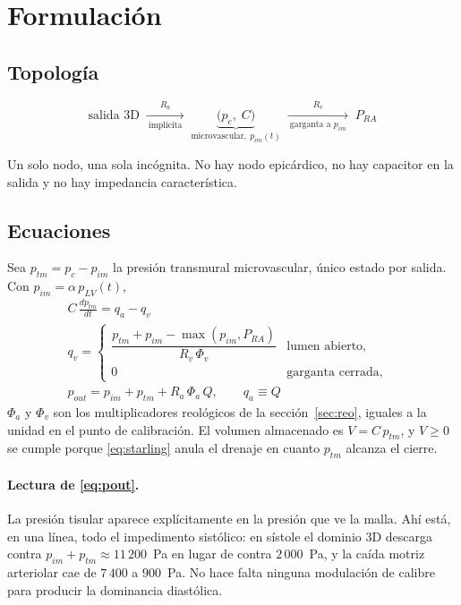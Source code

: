 \documentclass[11pt]{article}
\begin{document}
\section{Formulaci\'on}

\subsection{Topolog\'ia}

\[
\text{salida 3D}\;
\xrightarrow[\ \text{impl\'icita}\ ]{R_a}\;
\underbrace{\bigl(p_c,\;C\bigr)}_{\text{microvascular},\ p_{im}(t)}\;
\xrightarrow[\ \text{garganta a }p_{im}\ ]{R_v}\;
P_{RA}
\]

\noindent
Un solo nodo, una sola inc\'ognita. No hay nodo epic\'ardico, no hay capacitor
en la salida y no hay impedancia caracter\'istica.

\subsection{Ecuaciones}

Sea $p_{tm}=p_c-p_{im}$ la presi\'on transmural microvascular, \'unico estado
por salida. Con $p_{im}=\alpha\,p_{LV}(t)$,
\begin{align}
  \boxed{\;C\,\frac{d p_{tm}}{dt} = q_a-q_v\;}&
  \label{eq:balance}\\[2pt]
  \boxed{\;q_v = \begin{cases}
      \dfrac{p_{tm}+p_{im}-\max(p_{im},P_{RA})}{R_v\,\Phi_v}
        & \text{lumen abierto,}\\[8pt]
      0 & \text{garganta cerrada,}
    \end{cases}\;}&
  \label{eq:starling}\\[2pt]
  \boxed{\;p_{out} = p_{im}+p_{tm}+R_a\,\Phi_a\,Q,
  \qquad q_a\equiv Q\;}&
  \label{eq:pout}
\end{align}
$\Phi_a$ y $\Phi_v$ son los multiplicadores reol\'ogicos de la
secci\'on~\ref{sec:reo}, iguales a la unidad en el punto de calibraci\'on. El
volumen almacenado es $V=C\,p_{tm}$, y $V\ge0$ se cumple porque
\eqref{eq:starling} anula el drenaje en cuanto $p_{tm}$ alcanza el cierre.

\paragraph{Lectura de \eqref{eq:pout}.} La presi\'on tisular aparece
expl\'icitamente en la presi\'on que ve la malla. Ah\'i est\'a, en una l\'inea,
todo el impedimento sist\'olico: en s\'istole el dominio 3D descarga contra
$p_{im}+p_{tm}\approx11\,200$~Pa en lugar de contra $2\,000$~Pa, y la ca\'ida
motriz arteriolar cae de $7\,400$ a $900$~Pa. No hace falta ninguna modulaci\'on
de calibre para producir la dominancia diast\'olica.
\end{document}
